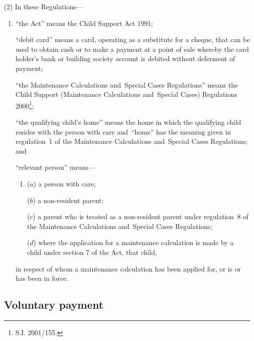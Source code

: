 \documentclass[12pt,a4paper]{article}
\begin{document}
(2) In these Regulations—
\begin{enumerate}\item[]
“the Act” means the Child Support Act 1991;

“debit card” means a card, operating as a substitute for a cheque, that can be used to obtain cash or to make a payment at a point of sale whereby the card holder’s bank or building society account is debited without deferment of payment;

“the Maintenance Calculations and~Special Cases Regulations” means the Child Support (Maintenance Calculations and~Special Cases) Regulations 2000\footnote{\frenchspacing S.I. 2001/155.};

“the qualifying child’s home” means the home in which the qualifying child resides with the person with care and~“home” has the meaning given in regulation~1 of the Maintenance Calculations and~Special Cases Regulations; and

“relevant person” means—
\begin{enumerate}\item[]
($a$) 
a person with care;

($b$) 
a non-resident parent;

($c$) 
a parent who is treated as a non-resident parent under regulation~8 of the Maintenance Calculations and~Special Cases Regulations;

($d$) 
where the application for a maintenance calculation is made by a child under section 7 of the Act, that child,
\end{enumerate}
in respect of whom a maintenance calculation has been applied for, 
or is or has been in force.
\end{enumerate}


\subsection[2. Voluntary payment]{Voluntary payment}
\end{document}

